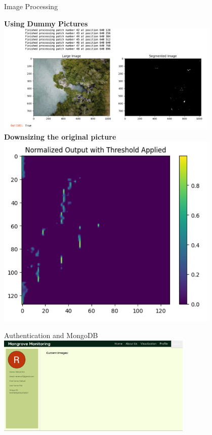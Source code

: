 \begin{frame}{Image Processing}
    \centering
    \begin{minipage}{0.8\textwidth}
        \centering
        \textbf{Using Dummy Pictures} \\[0.5em]
        \includegraphics[height=0.35\textheight,width=0.8\textwidth,keepaspectratio]{images/mm_smaller_image.png} \\[1em] %
        \textbf{Downsizing the original picture} \\[0.5em]
        \includegraphics[height=0.35\textheight,width=0.8\textwidth,keepaspectratio]{images/mm_downsizing.png}
    \end{minipage}
\end{frame}




\begin{frame}{Authentication and MongoDB}
    \centering
    \includegraphics[height=0.7\textheight,width=0.7\textwidth,keepaspectratio]{images/mm_profile.png}
\end{frame}

